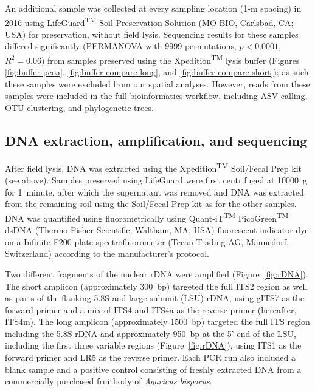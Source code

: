 \documentclass[
  12pt,
]{article}
\begin{document}
An additional sample was collected at every sampling location (1-m spacing) in 2016 using LifeGuard\textsuperscript{TM} Soil Preservation Solution (MO BIO, Carlsbad, CA; USA) for preservation, without field lysis.
Sequencing results for these samples differed significantly (PERMANOVA with 9999 permutations, \(p < 0.0001\), \(R^2 = 0.06\)) from samples preserved using the Xpedition\textsuperscript{TM} lysis buffer (Figures \ref{fig:buffer-pcoa}, \ref{fig:buffer-compare-long}, and \ref{fig:buffer-compare-short}); as such these samples were excluded from our spatial analyses.
However, reads from these samples were included in the full bioinformatics workflow, including ASV calling, OTU clustering, and phylogenetic trees.

\hypertarget{dna-extraction-amplification-and-sequencing}{%
\subsection{DNA extraction, amplification, and sequencing}\label{dna-extraction-amplification-and-sequencing}}

After field lysis, DNA was extracted using the Xpedition\textsuperscript{TM} Soil/Fecal Prep kit (see above).
Samples preserved using LifeGuard were first centrifuged at 10000~g for 1~minute, after which the supernatant was removed and DNA was extracted from the remaining soil using the Soil/Fecal Prep kit as for the other samples.
DNA was quantified using fluorometrically using Quant-iT\textsuperscript{TM} PicoGreen\textsuperscript{TM} dsDNA (Thermo Fisher Scientific, Waltham, MA, USA) fluorescent indicator dye on a Infinite F200 plate spectrofluorometer (Tecan Trading AG, Männedorf, Switzerland) according to the manufacturer's protocol.

Two different fragments of the nuclear rDNA were amplified (Figure~\ref{fig:rDNA}).
The short amplicon (approximately 300~bp) targeted the full ITS2 region as well as parts of the flanking 5.8S and large subunit (LSU) rDNA, using gITS7 \autocite{ihrmark2012} as the forward primer and a mix of ITS4 \autocite{white1990amplification} and ITS4a \autocite{urbina2016} as the reverse primer (hereafter, ITS4m).
The long amplicon (approximately 1500~bp) targeted the full ITS region including the 5.8S rDNA and approximately 950~bp at the 5' end of the LSU, including the first three variable regions (Figure~\ref{fig:rDNA}), using ITS1 \autocite{white1990amplification} as the forward primer and LR5 \autocite{vilgalys1990} as the reverse primer.
Each PCR run also included a blank sample and a positive control consisting of freshly extracted DNA from a commercially purchased fruitbody of \emph{Agaricus bisporus}.
\end{document}
